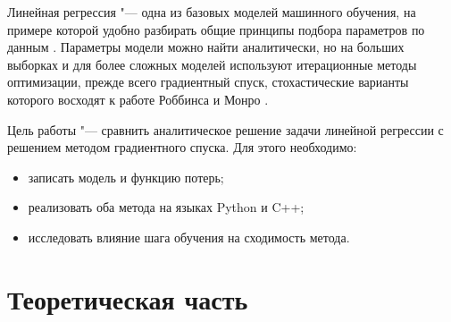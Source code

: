 \documentclass[coursework]{SCWorks}
\begin{document}

\date{2026}

\maketitle

\secNumbering

\tableofcontents




\intro
Линейная регрессия "--- одна из базовых моделей машинного обучения, на примере которой удобно разбирать общие принципы подбора параметров по данным \cite{ESL,PRML}. Параметры модели можно найти аналитически, но на больших выборках и для более сложных моделей используют итерационные методы оптимизации, прежде всего градиентный спуск, стохастические варианты которого восходят к работе Роббинса и Монро \cite{RobbinsMonro}.

Цель работы "--- сравнить аналитическое решение задачи линейной регрессии с решением методом градиентного спуска. Для этого необходимо:
\begin{itemize}
    \item записать модель и функцию потерь;
    \item реализовать оба метода на языках Python и C++;
    \item исследовать влияние шага обучения на сходимость метода.
\end{itemize}

\section{Теоретическая часть}
\end{document}
